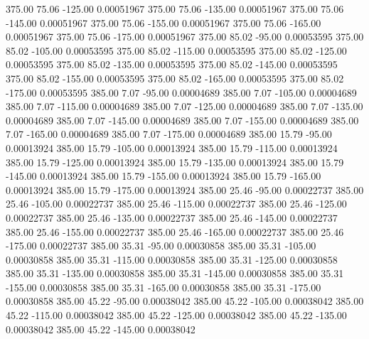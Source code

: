     375.00     75.06   -125.00     0.00051967
    375.00     75.06   -135.00     0.00051967
    375.00     75.06   -145.00     0.00051967
    375.00     75.06   -155.00     0.00051967
    375.00     75.06   -165.00     0.00051967
    375.00     75.06   -175.00     0.00051967
    375.00     85.02    -95.00     0.00053595
    375.00     85.02   -105.00     0.00053595
    375.00     85.02   -115.00     0.00053595
    375.00     85.02   -125.00     0.00053595
    375.00     85.02   -135.00     0.00053595
    375.00     85.02   -145.00     0.00053595
    375.00     85.02   -155.00     0.00053595
    375.00     85.02   -165.00     0.00053595
    375.00     85.02   -175.00     0.00053595
    385.00      7.07    -95.00     0.00004689
    385.00      7.07   -105.00     0.00004689
    385.00      7.07   -115.00     0.00004689
    385.00      7.07   -125.00     0.00004689
    385.00      7.07   -135.00     0.00004689
    385.00      7.07   -145.00     0.00004689
    385.00      7.07   -155.00     0.00004689
    385.00      7.07   -165.00     0.00004689
    385.00      7.07   -175.00     0.00004689
    385.00     15.79    -95.00     0.00013924
    385.00     15.79   -105.00     0.00013924
    385.00     15.79   -115.00     0.00013924
    385.00     15.79   -125.00     0.00013924
    385.00     15.79   -135.00     0.00013924
    385.00     15.79   -145.00     0.00013924
    385.00     15.79   -155.00     0.00013924
    385.00     15.79   -165.00     0.00013924
    385.00     15.79   -175.00     0.00013924
    385.00     25.46    -95.00     0.00022737
    385.00     25.46   -105.00     0.00022737
    385.00     25.46   -115.00     0.00022737
    385.00     25.46   -125.00     0.00022737
    385.00     25.46   -135.00     0.00022737
    385.00     25.46   -145.00     0.00022737
    385.00     25.46   -155.00     0.00022737
    385.00     25.46   -165.00     0.00022737
    385.00     25.46   -175.00     0.00022737
    385.00     35.31    -95.00     0.00030858
    385.00     35.31   -105.00     0.00030858
    385.00     35.31   -115.00     0.00030858
    385.00     35.31   -125.00     0.00030858
    385.00     35.31   -135.00     0.00030858
    385.00     35.31   -145.00     0.00030858
    385.00     35.31   -155.00     0.00030858
    385.00     35.31   -165.00     0.00030858
    385.00     35.31   -175.00     0.00030858
    385.00     45.22    -95.00     0.00038042
    385.00     45.22   -105.00     0.00038042
    385.00     45.22   -115.00     0.00038042
    385.00     45.22   -125.00     0.00038042
    385.00     45.22   -135.00     0.00038042
    385.00     45.22   -145.00     0.00038042
